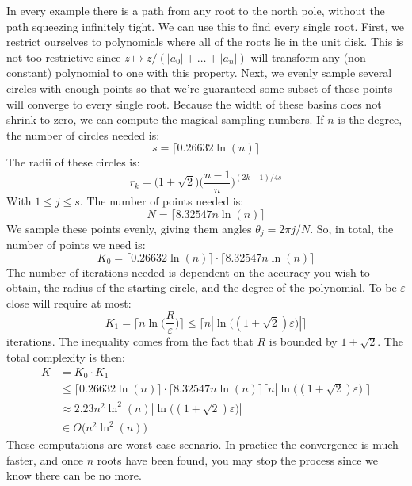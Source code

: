 \documentclass{article}
\newcommand{\ceil}[2][]{#1\lceil#2#1\rceil}
\begin{document}
        In every example there is a path from any root to the north pole,
        without the path squeezing infinitely tight. We can use this to find
        every single root. First, we restrict ourselves to polynomials where all
        of the roots lie in the unit disk. This is not too restrictive since
        $z\mapsto{z}/(|a_{0}|+\dots+|a_{n}|)$ will transform any
        (non-constant) polynomial to one with this property. Next, we evenly sample
        several circles with enough points so that we're guaranteed some subset of these points
        will converge to every single root. Because the width of these basins does not shrink
        to zero, we can compute the magical sampling numbers. If $n$ is the degree, the number
        of circles needed is:
        \begin{equation}
            s=\ceil{0.26632\ln(n)}
        \end{equation}
        The radii of these circles is:
        \begin{equation}
            r_{k}=\big(1+\sqrt{2}\big)\Big(\frac{n-1}{n}\Big)^{(2k-1)/4s}
        \end{equation}
        With $1\leq{j}\leq{s}$. The number of points needed is:
        \begin{equation}
            N=\ceil{8.32547n\ln(n)}
        \end{equation}
        We sample these points evenly, giving them angles $\theta_{j}=2\pi{j}/N$.
        So, in total, the number of points we need is:
        \begin{equation}
            K_{0}=\ceil{0.26632\ln(n)}\cdot\ceil{8.32547n\ln(n)}
        \end{equation}
        The number of iterations needed is dependent on the accuracy you wish to obtain,
        the radius of the starting circle, and the degree of the polynomial. To be
        $\varepsilon$ close will require at most:
        \begin{equation}
            K_{1}=\ceil{n\ln\Big(\frac{R}{\varepsilon}\Big)}\leq
                \ceil{n|\ln\big((1+\sqrt{2})\varepsilon\big)|}
        \end{equation}
        iterations. The inequality comes from the fact that $R$ is bounded by $1+\sqrt{2}$.
        The total complexity is then:
        \begin{subequations}
            \begin{align}
                K&=K_{0}\cdot{K}_{1}\\
                &\leq
                \ceil{0.26632\ln(n)}\cdot\ceil{8.32547n\ln(n)}
                    \ceil{n|\ln\big((1+\sqrt{2})\varepsilon\big)|}\\
                &\approx{2}.23n^{2}\ln^{2}(n)|\ln\big((1+\sqrt{2})\varepsilon\big)|\\
                &\in{O}\Big(n^{2}\ln^{2}(n)\Big)
            \end{align}
        \end{subequations}
        These computations are worst case scenario. In practice the convergence is much faster,
        and once $n$ roots have been found, you may stop the process since we know there can be
        no more.
\end{document}
